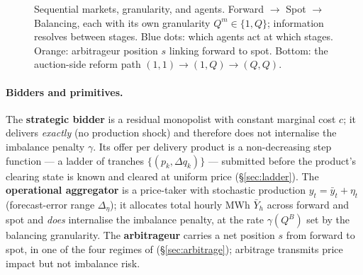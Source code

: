\documentclass[11pt,a4paper]{article}
\theoremstyle{definition}
\theoremstyle{remark}
\theoremstyle{plain}
\begin{document}
\begin{figure}[h]
\caption{Sequential markets, granularity, and agents. Forward $\to$ Spot $\to$ Balancing, each with its own granularity $Q^m \in \{1, Q\}$; information resolves between stages. Blue dots: which agents act at which stages. Orange: arbitrageur position $s$ linking forward to spot. Bottom: the auction-side reform path $(1,1) \to (1,Q) \to (Q,Q)$.}
\label{fig:model-structure}
\end{figure}

\paragraph{Bidders and primitives.} The \textbf{strategic bidder} is a residual monopolist with constant marginal cost $c$; it delivers \emph{exactly} (no production shock) and therefore does not internalise the imbalance penalty $\gamma$. Its offer per delivery product is a non-decreasing step function --- a ladder of tranches $\{(p_k, \Delta q_k)\}$ --- submitted before the product's clearing state is known and cleared at uniform price (\S\ref{sec:ladder}). The \textbf{operational aggregator} is a price-taker with stochastic production $y_t = \bar y_t + \eta_t$ (forecast-error range $\Delta_\eta$); it allocates total hourly MWh $\bar Y_h$ across forward and spot and \emph{does} internalise the imbalance penalty, at the rate $\gamma(Q^B)$ set by the balancing granularity. The \textbf{arbitrageur} carries a net position $s$ from forward to spot, in one of the four regimes of \citeauthor{ito_reguant_2016} (\S\ref{sec:arbitrage}); arbitrage transmits price impact but not imbalance risk.
\end{document}
